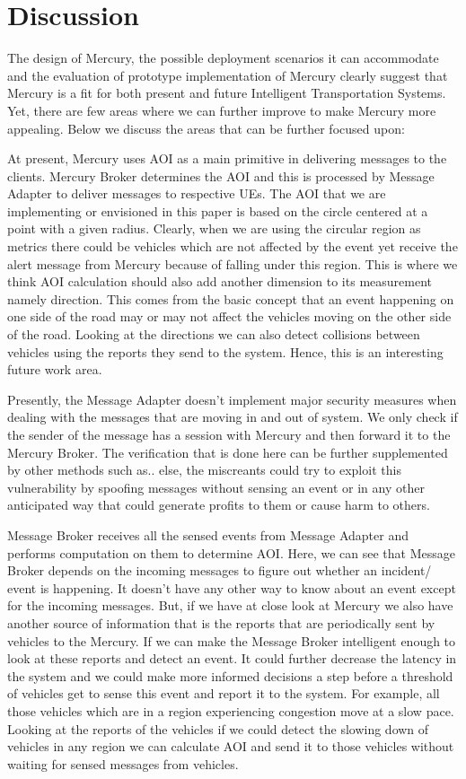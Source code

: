 \section{Discussion}

The design of Mercury, the possible deployment scenarios it can
accommodate and the evaluation of prototype implementation of Mercury
clearly suggest that Mercury is a fit for both present and future
Intelligent Transportation Systems. Yet, there are few areas where we
can further improve to make Mercury more appealing. Below we discuss
the areas that can be further focused upon:

At present, Mercury uses AOI as a main primitive in delivering
messages to the clients. Mercury Broker determines the AOI and this is
processed by Message Adapter to deliver messages to respective UEs.
The AOI that we are implementing or envisioned in this paper is based
on the circle centered at a point with a given radius. Clearly, when
we are using the circular region as metrics there could be vehicles
which are not affected by the event yet receive the alert message from
Mercury because of falling under this region. This is where we think
AOI calculation should also add another dimension to its measurement
namely direction. This comes from the basic concept that an event
happening on one side of the road may or may not affect the vehicles
moving on the other side of the road. Looking at the directions we can
also detect collisions between vehicles using the reports they send to
the system.  Hence, this is an interesting future work area.

Presently, the Message Adapter doesn't implement major security
measures when dealing with the messages that are moving in and out of
system. We only check if the sender of the message has a session with
Mercury and then forward it to the Mercury Broker. The verification
that is done here can be further supplemented by other methods such
as.. else, the miscreants could try to exploit this vulnerability by
spoofing messages without sensing an event or in any other anticipated
way that could generate profits to them or cause harm to others.

Message Broker receives all the sensed events from Message Adapter and
performs computation on them to determine AOI. Here, we can see that
Message Broker depends on the incoming messages to figure out whether
an incident/ event is happening. It doesn't have any other way to know
about an event except for the incoming messages. But, if we have at
close look at Mercury we also have another source of information that
is the reports that are periodically sent by vehicles to the
Mercury. If we can make the Message Broker intelligent enough to look
at these reports and detect an event. It could further decrease the
latency in the system and we could make more informed decisions a step
before a threshold of vehicles get to sense this event and report it
to the system. For example, all those vehicles which are in a region
experiencing congestion move at a slow pace. Looking at the reports of
the vehicles if we could detect the slowing down of vehicles in any
region we can calculate AOI and send it to those vehicles without
waiting for sensed messages from vehicles.

